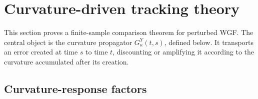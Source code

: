 \section{Curvature-driven tracking theory}
\label{sec:tracking-theory}

This section proves a finite-sample comparison theorem for perturbed WGF.
The central object is the curvature propagator \(G_\kappa^Y(t,s)\), defined below.
It transports an error created at time \(s\) to time \(t\), discounting or
amplifying it according to the curvature accumulated after its creation.

\subsection{Curvature-response factors}
\label{subsec:curvature-budgets}

